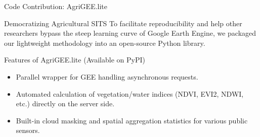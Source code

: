 \begin{frame}{Code Contribution: AgriGEE.lite}
    \begin{block}{Democratizing Agricultural SITS}
        To facilitate reproducibility and help other researchers bypass the steep learning curve of Google Earth Engine, we packaged our lightweight methodology into an open-source Python library.
    \end{block}

    \begin{block}{Features of AgriGEE.lite (Available on PyPI)}
        \begin{itemize}
            \item Parallel wrapper for GEE handling asynchronous requests.
            \item Automated calculation of vegetation/water indices (NDVI, EVI2, NDWI, etc.) directly on the server side.
            \item Built-in cloud masking and spatial aggregation statistics for various public sensors.
        \end{itemize}
    \end{block}
\end{frame}